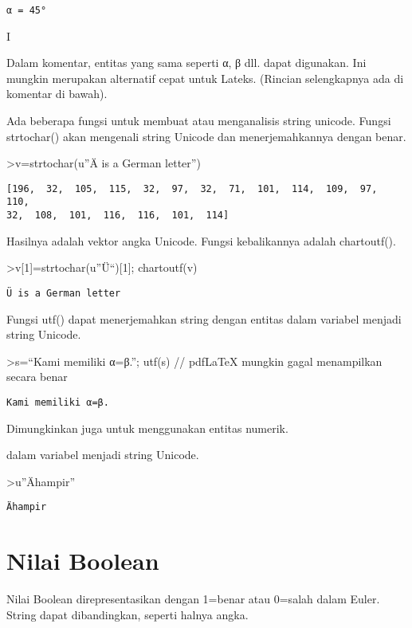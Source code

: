 \documentclass[
]{book}
\begin{document}
\begin{verbatim}
α = 45°
\end{verbatim}

I

Dalam komentar, entitas yang sama seperti α, β dll. dapat digunakan. Ini mungkin merupakan alternatif cepat untuk Lateks. (Rincian selengkapnya ada di komentar di bawah).

Ada beberapa fungsi untuk membuat atau menganalisis string unicode. Fungsi strtochar() akan mengenali string Unicode dan menerjemahkannya dengan benar.

\textgreater v=strtochar(u''Ä is a German letter'')

\begin{verbatim}
[196,  32,  105,  115,  32,  97,  32,  71,  101,  114,  109,  97,  110,
32,  108,  101,  116,  116,  101,  114]
\end{verbatim}

Hasilnya adalah vektor angka Unicode. Fungsi kebalikannya adalah chartoutf().

\textgreater v{[}1{]}=strtochar(u''Ü``){[}1{]}; chartoutf(v)

\begin{verbatim}
Ü is a German letter
\end{verbatim}

Fungsi utf() dapat menerjemahkan string dengan entitas dalam variabel menjadi string Unicode.

\textgreater s=``Kami memiliki α=β.''; utf(s) // pdfLaTeX mungkin gagal menampilkan secara benar

\begin{verbatim}
Kami memiliki α=β.
\end{verbatim}

Dimungkinkan juga untuk menggunakan entitas numerik.

dalam variabel menjadi string Unicode.

\textgreater u''Ähampir''

\begin{verbatim}
Ähampir
\end{verbatim}

\section{Nilai Boolean}\label{nilai-boolean}

Nilai Boolean direpresentasikan dengan 1=benar atau 0=salah dalam Euler. String dapat dibandingkan, seperti halnya angka.
\end{document}
